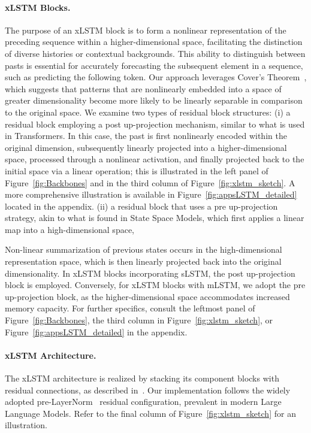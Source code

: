 \paragraph{xLSTM Blocks.}
\label{sec:xLSTMblock}
The purpose of an xLSTM block is to form a nonlinear representation of the preceding sequence within a higher-dimensional space, facilitating the distinction of diverse histories or contextual backgrounds. This ability to distinguish between pasts is essential for accurately forecasting the subsequent element in a sequence, such as predicting the following token. Our approach leverages Cover’s Theorem~\citep{Cover:65}, which suggests that patterns that are nonlinearly embedded into a space of greater dimensionality become more likely to be linearly separable in comparison to the original space. We examine two types of residual block structures: (i) a residual block employing a post up-projection mechanism, similar to what is used in Transformers. In this case, the past is first nonlinearly encoded within the original dimension, subsequently linearly projected into a higher-dimensional space, processed through a nonlinear activation, and finally projected back to the initial space via a linear operation; this is illustrated in the left panel of Figure~\ref{fig:Backbones} and in the third column of Figure~\ref{fig:xlstm_sketch}. A more comprehensive illustration is available in Figure~\ref{fig:appsLSTM_detailed} located in the appendix. (ii) a residual block that uses a pre up-projection strategy, akin to what is found in State Space Models, which first applies a linear map into a high-dimensional space,

Non-linear summarization of previous states occurs in the high-dimensional representation space, which is then linearly projected back into the original dimensionality. In xLSTM blocks incorporating sLSTM, the post up-projection block is employed. Conversely, for xLSTM blocks with mLSTM, we adopt the pre up-projection block, as the higher-dimensional space accommodates increased memory capacity. For further specifics, consult the leftmost panel of Figure~\ref{fig:Backbones}, the third column in Figure~\ref{fig:xlstm_sketch}, or Figure~\ref{fig:appsLSTM_detailed} in the appendix.

\paragraph{xLSTM Architecture. }
\label{sec:xLSTMarchitecure}
The xLSTM architecture is realized by stacking its component blocks with residual connections, as described in~\citet{Srivastava:15,He:16}. Our implementation follows the widely adopted pre-LayerNorm~\citep{Ba:16b} residual configuration, prevalent in modern Large Language Models. Refer to the final column of Figure~\ref{fig:xlstm_sketch} for an illustration.

